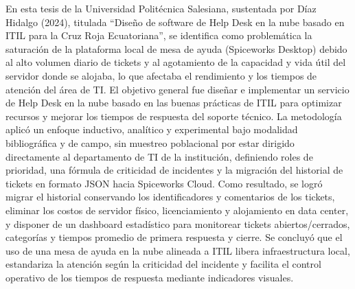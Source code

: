 En esta tesis de la Universidad Politécnica Salesiana, sustentada por Díaz Hidalgo (2024), titulada ``Diseño de software de Help Desk en la nube basado en ITIL para la Cruz Roja Ecuatoriana'', se identifica como problemática la saturación de la plataforma local de mesa de ayuda (Spiceworks Desktop) debido al alto volumen diario de tickets y al agotamiento de la capacidad y vida útil del servidor donde se alojaba, lo que afectaba el rendimiento y los tiempos de atención del área de TI. El objetivo general fue diseñar e implementar un servicio de Help Desk en la nube basado en las buenas prácticas de ITIL para optimizar recursos y mejorar los tiempos de respuesta del soporte técnico. La metodología aplicó un enfoque inductivo, analítico y experimental bajo modalidad bibliográfica y de campo, sin muestreo poblacional por estar dirigido directamente al departamento de TI de la institución, definiendo roles de prioridad, una fórmula de criticidad de incidentes y la migración del historial de tickets en formato JSON hacia Spiceworks Cloud. Como resultado, se logró migrar el historial conservando los identificadores y comentarios de los tickets, eliminar los costos de servidor físico, licenciamiento y alojamiento en data center, y disponer de un dashboard estadístico para monitorear tickets abiertos/cerrados, categorías y tiempos promedio de primera respuesta y cierre. Se concluyó que el uso de una mesa de ayuda en la nube alineada a ITIL libera infraestructura local, estandariza la atención según la criticidad del incidente y facilita el control operativo de los tiempos de respuesta mediante indicadores visuales.

\vspace{0.8em}

